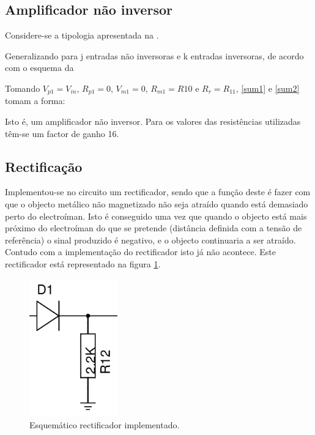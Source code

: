 \documentclass[%
  reprint,
  nofootinbib,
  amsmath,amssymb,
  aps,
  10pt,
  a4paper
]{revtex4-1}
\begin{document}
\subsection{Amplificador não inversor}

Considere-se a tipologia apresentada na .




Generalizando para j entradas não inversoras e k entradas inversoras, de acordo com o esquema da 

Tomando $V_{p1}=V_{in}$, $R_{p1}=0$, $V_{m1}=0$, $R_{m1}=R10$ e $R_r = R_{11}$, \eqref{sum1} e \eqref{sum2} tomam a forma:

Isto é, um amplificador não inversor. Para os valores das resistências utilizadas têm-se um factor de ganho 16.








\subsection{Rectificação}
Implementou-se no circuito um rectificador, sendo que a função deste é fazer com que o objecto metálico não magnetizado não seja atraído quando está demasiado perto do electroíman. Isto é conseguido uma vez que quando o objecto está mais próximo do electroíman do que se pretende (distância definida com a tensão de referência) o sinal produzido é negativo, e o objecto continuaria a ser atraído. Contudo com a implementação do rectificador isto já não acontece. Este rectificador está representado na figura \ref{fig:rectificador}.
\begin{figure}[h]
\includegraphics[width=1.5in]{../img/rectificador.png}
\caption{Esquemático rectificador implementado.}
\label{fig:rectificador}
\end{figure}
\end{document}
